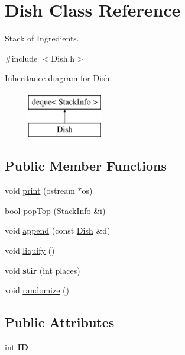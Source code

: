 \hypertarget{classDish}{\section{Dish Class Reference}
\label{classDish}
}


Stack of Ingredients.  




{\ttfamily \#include $<$Dish.\-h$>$}

Inheritance diagram for Dish\-:\begin{figure}[H]
\begin{center}
\leavevmode
\includegraphics[height=2.000000cm]{classDish}
\end{center}
\end{figure}
\subsection*{Public Member Functions}
\begin{DoxyCompactItemize}
\item 
void \hyperlink{classDish_a1af363ad3f1c4df4971f82051763df20}{print} (ostream $\ast$os)
\item 
bool \hyperlink{classDish_a437c63798f934fdc3c80037d77a0d51e}{pop\-Top} (\hyperlink{structStackInfo}{Stack\-Info} \&i)
\item 
void \hyperlink{classDish_ac0abbc375bf201a4267b3b57c82d2a8f}{append} (const \hyperlink{classDish}{Dish} \&d)
\item 
void \hyperlink{classDish_a41b6fc6a531325d36d4607546291386b}{liquify} ()
\item 
\hypertarget{classDish_a9a8e6f0fd75809de987cb0cd1c89daab}{void {\bfseries stir} (int places)}\label{classDish_a9a8e6f0fd75809de987cb0cd1c89daab}

\item 
void \hyperlink{classDish_a1c60aa114f084117df18578e58f0725d}{randomize} ()
\end{DoxyCompactItemize}
\subsection*{Public Attributes}
\begin{DoxyCompactItemize}
\item 
\hypertarget{classDish_a14264990a9a7bc34f61336eeb6dcfcbd}{int {\bfseries I\-D}}\label{classDish_a14264990a9a7bc34f61336eeb6dcfcbd}

\end{DoxyCompactItemize}


